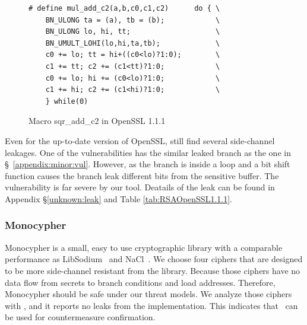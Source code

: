 \begin{figure}
    \centering
    \begin{lstlisting}[xleftmargin=.02\textwidth,xrightmargin=.01\textwidth]
# define mul_add_c2(a,b,c0,c1,c2)      do { \
    BN_ULONG ta = (a), tb = (b);            \
    BN_ULONG lo, hi, tt;                    \
    BN_UMULT_LOHI(lo,hi,ta,tb);             \
    c0 += lo; tt = hi+((c0<lo)?1:0);        \
    c1 += tt; c2 += (c1<tt)?1:0;            \
    c0 += lo; hi += (c0<lo)?1:0;            \
    c1 += hi; c2 += (c1<hi)?1:0;            \
    } while(0)
\end{lstlisting}
    \vspace*{-6pt}
    \caption{Macro \textsf{sqr\_add\_c2} in OpenSSL 1.1.1}
    \label{fig:new_sqr2}
    \vspace*{-6pt}
\end{figure}

Even for the up-to-date version of OpenSSL, \tool{} still find several
side-channel leakages. One of the vulnerabilities has the similar leaked
branch as the one in \S~\ref{appendix:minor:vul}. However, as the branch
is inside a loop and a bit shift function causes the branch leak different
bits from the sensitive buffer. The vulnerability is far severe by our tool.
Deatails of the leak can be found in Appendix \S\ref{unknown:leak} and 
Table \ref{tab:RSAOpenSSL1.1.1}.

\subsubsection{Monocypher}\label{eval:mono}
Monocypher is a small, easy to use cryptographic library with a
comparable performance as LibSodium~\cite{libsodium} and NaCl~\cite{bernstein2012security}. 
We choose four ciphers that are 
designed to be more side-channel resistant from the library.
Because those ciphers have no 
data flow from secrets to branch conditions and load addresses.
Therefore, Monocypher should be safe under our threat models. 
We analyze those ciphers with \tool{}, and it reports no leaks from the
implementation.
This indicates that \tool\ can be used for countermeasure confirmation.


